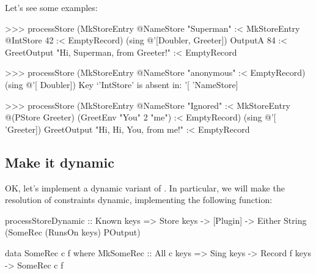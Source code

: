 \documentclass[demotion-paper.tex]{subfiles}
\begin{document}
Let's see some examples:
\begin{repl}
>>> processStore 
      (MkStoreEntry @NameStore "Superman"
        :< MkStoreEntry @IntStore 42
        :< EmptyRecord)
      (sing @'[Doubler, Greeter])
OutputA 84
  :< GreetOutput "Hi, Superman, from Greeter!"
  :< EmptyRecord

>>> processStore 
      (MkStoreEntry @NameStore "anonymous"
        :< EmptyRecord) 
      (sing @'[ Doubler])
Key `'IntStore' is absent in: '[ 'NameStore]

>>> processStore 
      (MkStoreEntry @NameStore "Ignored"
        :< MkStoreEntry @(PStore Greeter) 
            (GreetEnv "You" 2 "me")
        :< EmptyRecord) (sing @'[ 'Greeter])
GreetOutput "Hi, Hi, You, from me!" :< EmptyRecord
\end{repl}

\subsection{Make it dynamic}
OK, let's implement a dynamic variant of .
In particular, we will make the resolution of  constraints dynamic, implementing the following function:

\begin{code}
processStoreDynamic :: Known keys
  => Store keys -> [Plugin]
  -> Either String 
    (SomeRec (RunsOn keys) POutput)

data SomeRec c f where
  MkSomeRec :: All c keys => Sing keys
    -> Record f keys -> SomeRec c f
\end{code}
\end{document}
